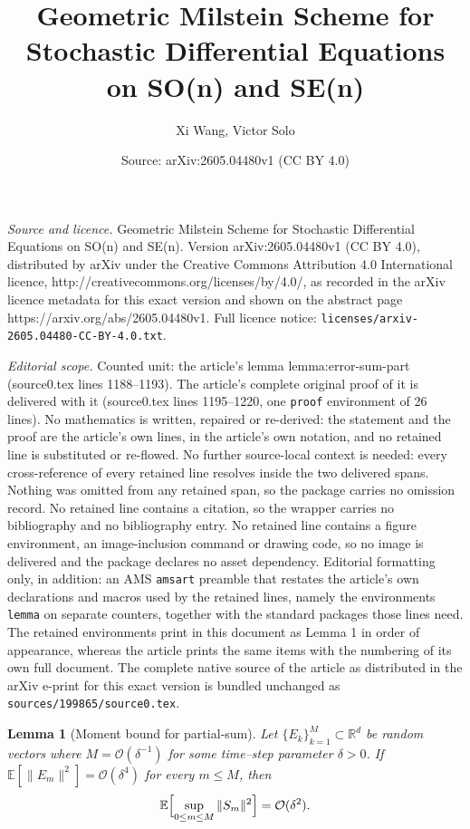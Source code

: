 \documentclass[10pt,a4paper]{amsart}
\title{\huge Geometric Milstein Scheme for Stochastic Differential Equations on SO(n) and SE(n)}
\author{Xi Wang, Victor Solo}
\date{Source: arXiv:2605.04480v1 (CC BY 4.0)}
\newtheorem{lemma}{Lemma}
\newcommand{\E}{\mathbb{E}}
\begin{document}
\maketitle

\noindent\emph{Source and licence.} \huge Geometric Milstein Scheme for Stochastic Differential Equations on SO(n) and SE(n). Version arXiv:2605.04480v1 (CC BY 4.0), distributed by arXiv under the Creative Commons Attribution 4.0 International licence, http://creativecommons.org/licenses/by/4.0/, as recorded in the arXiv licence metadata for this exact version and shown on the abstract page https://arxiv.org/abs/2605.04480v1. Full licence notice: \texttt{licenses/arxiv-2605.04480-CC-BY-4.0.txt}.\par\smallskip

\noindent\textit{Editorial scope.} Counted unit: the article's lemma lemma:error-sum-part (source0.tex lines 1188--1193). The article's complete original proof of it is delivered with it (source0.tex lines 1195--1220, one \texttt{proof} environment of 26 lines). No mathematics is written, repaired or re-derived: the statement and the proof are the article's own lines, in the article's own notation, and no retained line is substituted or re-flowed.  No further source-local context is needed: every cross-reference of every retained line resolves inside the two delivered spans.  Nothing was omitted from any retained span, so the package carries no omission record.  No retained line contains a citation, so the wrapper carries no bibliography and no bibliography entry.  No retained line contains a figure environment, an image-inclusion command or drawing code, so no image is delivered and the package declares no asset dependency.  Editorial formatting only, in addition: an AMS \texttt{amsart} preamble that restates the article's own declarations and macros used by the retained lines, namely the environments \texttt{lemma} on separate counters, together with the standard packages those lines need.  The retained environments print in this document as Lemma 1 in order of appearance, whereas the article prints the same items with the numbering of its own full document.  The complete native source of the article as distributed in the arXiv e-print for this exact version is bundled unchanged as \texttt{sources/199865/source0.tex}.
\begin{lemma}[Moment bound for partial‐sum]\label{lemma:error-sum-part} Let $\{E_k\}_{k=1}^{M}\subset\mathbb{R}^{d}$ be random vectors where $M = \mathcal{O}(\delta^{-1})$ for some time–step parameter $\delta > 0$. If $\E[\|E_m\|^{2}] = \mathcal{O}(\delta^{4})$ for every $m\le M$, then
\[
    \E\Bigl[\sup_{0\le m\le M} \|S_m\|^{2}\Bigr] 
    = \mathcal{O}(\delta^{2}).
\]
\end{lemma}
\end{document}
